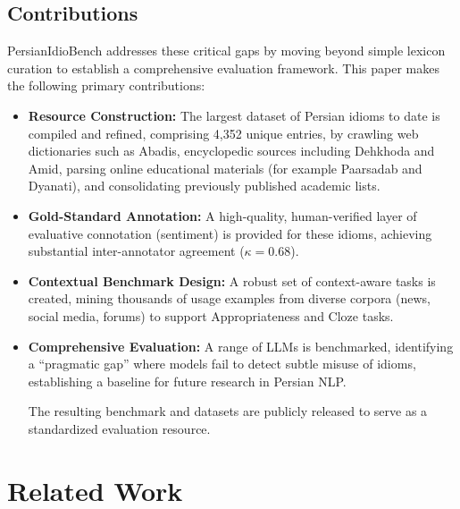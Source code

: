 \documentclass[11pt,a4paper]{article}
\begin{document}
\subsection{Contributions}
PersianIdioBench addresses these critical gaps by moving beyond simple lexicon curation to establish a comprehensive evaluation framework. This paper makes the following primary contributions:
\begin{itemize}
    \item \textbf{Resource Construction:} The largest dataset of Persian idioms to date is compiled and refined, comprising 4,352 unique entries, by crawling web dictionaries such as Abadis, encyclopedic sources including Dehkhoda and Amid, parsing online educational materials (for example Paarsadab and Dyanati), and consolidating previously published academic lists.
    \item \textbf{Gold-Standard Annotation:} A high-quality, human-verified layer of evaluative connotation (sentiment) is provided for these idioms, achieving substantial inter-annotator agreement ($\kappa=0.68$).
    \item \textbf{Contextual Benchmark Design:} A robust set of context-aware tasks is created, mining thousands of usage examples from diverse corpora (news, social media, forums) to support Appropriateness and Cloze tasks.
    \item \textbf{Comprehensive Evaluation:} A range of LLMs is benchmarked, identifying a ``pragmatic gap'' where models fail to detect subtle misuse of idioms, establishing a baseline for future research in Persian NLP.

The resulting benchmark and datasets are publicly released to serve as a standardized evaluation resource.
\end{itemize}

\section{Related Work}
\end{document}
